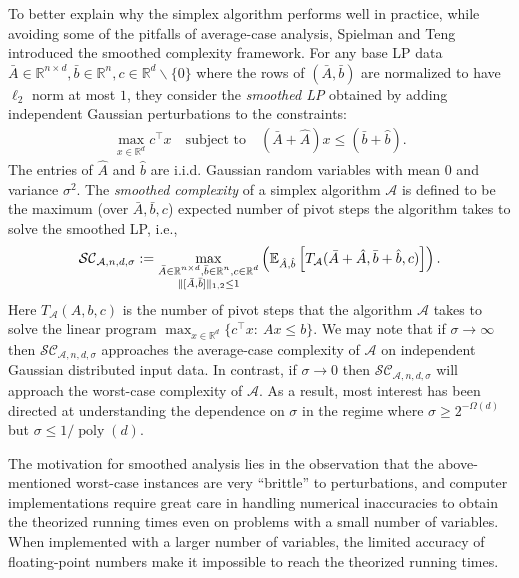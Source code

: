 \documentclass{theoretics}
\newcommand{\R}{\mathbb R}
\newcommand{\E}{\mathbb E}
\newcommand{\poly}{\operatorname{poly}}
\begin{document}
To better explain why the simplex algorithm performs well in practice, while avoiding some of the pitfalls
of average-case analysis, Spielman and Teng \cite{ST04} introduced the smoothed complexity framework. 
For any base LP
data $\bar{A} \in \R^{n\times d}, \bar{b}\in \R^n, c\in \R^d \backslash \{0\}$
where the rows of $(\bar A,\bar b)$ are normalized to have $\ell_2$ norm at most $1$, they consider
the \emph{smoothed LP} obtained by adding independent Gaussian perturbations to the
constraints:
\begin{align*}
    \max_{x\in \R^d} c^\top x \quad \text{subject to} \quad (\bar{A} + \hat{A}) x \leq (\bar{b} + \hat{b}).
\end{align*}
The entries of $\hat{A}$ and $\hat{b}$ are i.i.d. Gaussian random variables
with mean $0$ and variance $\sigma^2$. The \emph{smoothed complexity} of a simplex
algorithm $\mathcal{A}$ is defined to be the maximum (over $\bar A, \bar b, c$) expected
number of pivot steps the algorithm takes to solve the smoothed LP, i.e.,
\begin{align*}
    \mathcal{SC}_{\mathcal{A},n,d,\sigma} := \max_{\substack{\bar{A} \in \R^{n\times d}, \bar{b}\in \R^n, c\in \R^d \\ \|[\Bar{A},\Bar{b}]\|_{1, 2} \leq 1}} \left(\E_{\hat{A},\hat{b}}\left[ T_{\mathcal{A}}(\bar{A} + \hat{A}, \bar{b} + \hat{b}, c) \right] \right).
\end{align*}
Here $T_{\mathcal{A}}(A,b,c)$ is the number of pivot steps that the algorithm $\mathcal{A}$ takes to solve the linear program $\max_{x\in \R^d} \{c^\top x:  ~ A x \leq b\}$.
We may note that if $\sigma \to \infty$ then $\mathcal{SC}_{\mathcal A, n, d, \sigma}$
approaches the average-case complexity of $\mathcal{A}$ on independent Gaussian distributed input data.
In contrast, if $\sigma \to 0$ then $\mathcal{SC}_{\mathcal A, n, d, \sigma}$ will approach
the worst-case complexity of $\mathcal A$.
As a result, most interest has been directed at understanding the dependence on $\sigma$
in the regime where $\sigma \geq 2^{-\Omega(d)}$ but $\sigma \leq 1/\poly(d)$.

The motivation for smoothed analysis lies in the observation that the above-mentioned
worst-case instances are very ``brittle'' to perturbations, and computer implementations
require great care in handling numerical inaccuracies to obtain the theorized running times
even on problems with a small number of variables. When implemented with a larger number of
variables, the limited accuracy of floating-point numbers make it impossible to reach
the theorized running times.
\end{document}
